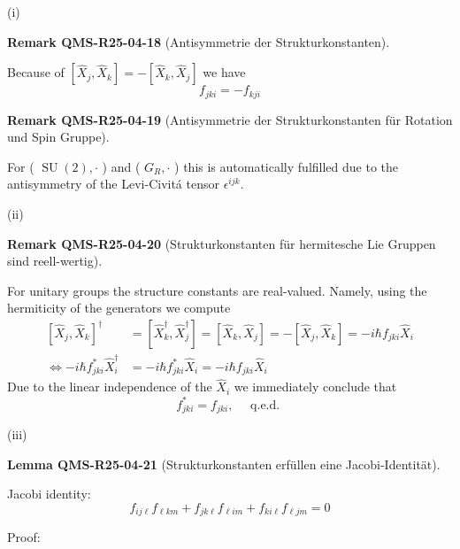 \documentclass[10pt, letterpaper]{article}
\newcommand{\CustomHeading}[3]{%
  \par\medskip\noindent%
  \textbf{#1 #2} \textnormal{(#3)}.\enskip%
}
\newenvironment{LEM}[2]{\begin{unitbox}\CustomHeading{Lemma}{#1}{#2}}{\end{unitbox}}
\newenvironment{REM}[2]{\begin{unitbox}\CustomHeading{Remark}{#1}{#2}}{\end{unitbox}}
\begin{document}
(i) 

\begin{REM}{QMS-R25-04-18}{Antisymmetrie der Strukturkonstanten}
Because of $\left[\hat{X}_{j}, \hat{X}_{k}\right]=-\left[\hat{X}_{k}, \hat{X}_{j}\right]$ we have
$$
f_{j k i}=-f_{k j i}
$$
\end{REM}


\begin{REM}{QMS-R25-04-19}{Antisymmetrie der Strukturkonstanten für Rotation und Spin Gruppe}
For ( $\operatorname{SU}(2), \cdot$ ) and ( $G_{R}, \cdot$ ) this is automatically fulfilled due to the antisymmetry of the Levi-Civitá tensor $\epsilon^{i j k}$.
\end{REM}


(ii) 


\begin{REM}{QMS-R25-04-20}{Strukturkonstanten für hermitesche Lie Gruppen sind reell-wertig}
For unitary groups the structure constants are real-valued. Namely, using the hermiticity of the generators we compute
$$
\begin{aligned}
{\left[\hat{X}_{j}, \hat{X}_{k}\right]^{\dagger} } & =\left[\hat{X}_{k}^{\dagger}, \hat{X}_{j}^{\dagger}\right]=\left[\hat{X}_{k}, \hat{X}_{j}\right]=-\left[\hat{X}_{j}, \hat{X}_{k}\right]=-i \hbar f_{j k i} \hat{X}_{i} \\
\Longleftrightarrow-i \hbar f_{j k i}^{*} \hat{X}_{i}^{\dagger} & =-i \hbar f_{j k i}^{*} \hat{X}_{i}=-i \hbar f_{j k i} \hat{X}_{i}
\end{aligned}
$$
Due to the linear independence of the $\hat{X}_{i}$ we immediately conclude that
$$
f_{j k i}^{*}=f_{j k i}, \quad \text { q.e.d. }
$$
\end{REM}



(iii) 


\begin{LEM}{QMS-R25-04-21}{Strukturkonstanten erfüllen eine Jacobi-Identität}
Jacobi identity:
$$
f_{i j \ell} f_{\ell k m}+f_{j k \ell} f_{\ell i m}+f_{k i \ell} f_{\ell j m}=0
$$
\end{LEM}

Proof: 
\end{document}
